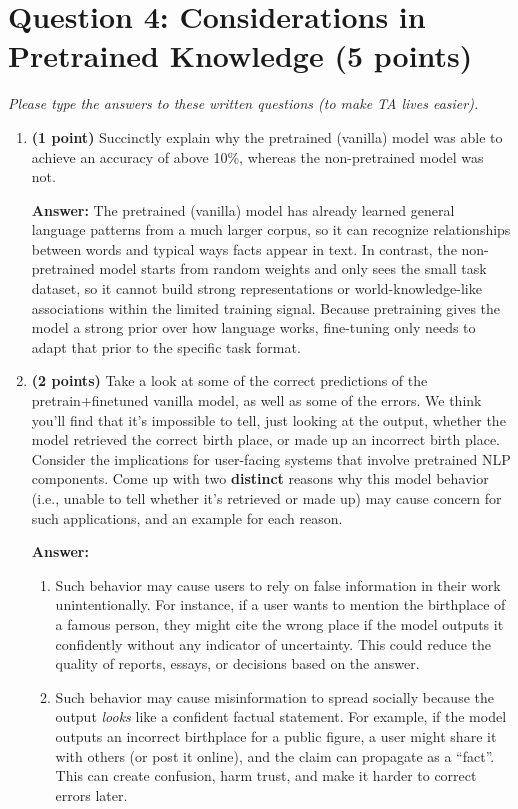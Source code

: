 \documentclass[11pt]{article}
\begin{document}
\section*{Question 4: Considerations in Pretrained Knowledge (5 points)}
\textit{Please type the answers to these written questions (to make TA lives easier).}

\begin{enumerate}[label=(\alph*)]

\item \textbf{(1 point)} Succinctly explain why the pretrained (vanilla) model was able to achieve an accuracy of above 10\%, whereas the non-pretrained model was not.

\medskip
\textbf{Answer:} The pretrained (vanilla) model has already learned general language patterns from a much larger corpus, so it can recognize relationships between words and typical ways facts appear in text. In contrast, the non-pretrained model starts from random weights and only sees the small task dataset, so it cannot build strong representations or world-knowledge-like associations within the limited training signal. Because pretraining gives the model a strong prior over how language works, fine-tuning only needs to adapt that prior to the specific task format.

\item \textbf{(2 points)} Take a look at some of the correct predictions of the pretrain+finetuned vanilla model, as well as some of the errors. We think you’ll find that it’s impossible to tell, just looking at the output, whether the model retrieved the correct birth place, or made up an incorrect birth place. Consider the implications for user-facing systems that involve pretrained NLP components. Come up with two \textbf{distinct} reasons why this model behavior (i.e., unable to tell whether it’s retrieved or made up) may cause concern for such applications, and an example for each reason.

\medskip
\textbf{Answer:}
\begin{enumerate}[label=\arabic*.]
  \item Such behavior may cause users to rely on false information in their work unintentionally. For instance, if a user wants to mention the birthplace of a famous person, they might cite the wrong place if the model outputs it confidently without any indicator of uncertainty. This could reduce the quality of reports, essays, or decisions based on the answer.
  \item Such behavior may cause misinformation to spread socially because the output \emph{looks} like a confident factual statement. For example, if the model outputs an incorrect birthplace for a public figure, a user might share it with others (or post it online), and the claim can propagate as a ``fact''. This can create confusion, harm trust, and make it harder to correct errors later.
\end{enumerate}


\end{enumerate}
\end{document}
